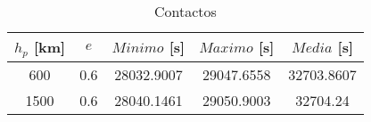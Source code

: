 \begin{table}[H] 
\centering 
\captionsetup{justification=centering,margin=10mm} 
\caption{Contactos} 
	{\renewcommand{\arraystretch}{1.2} 
	\begin{tabular}{ccccc} 
		$h_p$ [km] & $e$ & $Minimo$ [s] & $Maximo$ [s] & $Media$ [s] \\ 
		\hline 
		600 & 0.6 & 28032.9007 & 29047.6558 & 32703.8607 \\ 
		1500 & 0.6 & 28040.1461 & 29050.9003 & 32704.24 \\ 
		\hline 
	\end{tabular} 
	} 
\label{tab:contactos} 
\end{table}